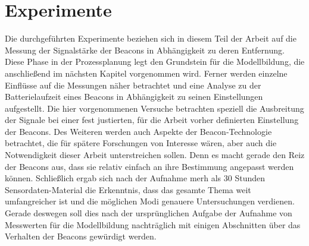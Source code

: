 \chapter{Experimente}
Die durchgeführten Experimente beziehen sich in diesem Teil der Arbeit auf die Messung der Signalstärke der Beacons in Abhängigkeit zu deren Entfernung. Diese Phase in der Prozessplanung legt den Grundstein für die Modellbildung, die anschließend im nächsten Kapitel vorgenommen wird. Ferner werden einzelne Einflüsse auf die Messungen näher betrachtet und eine Analyse zu der Batterielaufzeit eines Beacons in Abhängigkeit zu seinen Einstellungen aufgestellt. Die hier vorgenommenen Versuche betrachten speziell die Ausbreitung der Signale bei einer fest justierten, für die Arbeit vorher definierten Einstellung der Beacons. Des Weiteren werden auch Aspekte der Beacon-Technologie betrachtet, die für spätere Forschungen von Interesse wären, aber auch die Notwendigkeit dieser Arbeit unterstreichen sollen. Denn es macht gerade den Reiz der Beacons aus, dass sie relativ einfach an ihre Bestimmung angepasst werden können. Schließlich ergab sich nach der Aufnahme merh als 30 Stunden Sensordaten-Material die Erkenntnis, dass das gesamte Thema weit umfangreicher ist und die möglichen Modi genauere Untersuchungen verdienen. Gerade deswegen soll dies nach der ursprünglichen Aufgabe der Aufnahme von Messwerten für die Modellbildung nachträglich mit einigen Abschnitten über das Verhalten der Beacons gewürdigt werden.
